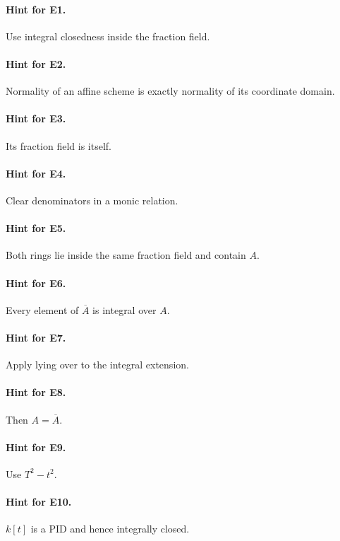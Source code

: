 \paragraph{Hint for E1.} Use integral closedness inside the fraction field.

\paragraph{Hint for E2.} Normality of an affine scheme is exactly normality of its coordinate domain.

\paragraph{Hint for E3.} Its fraction field is itself.

\paragraph{Hint for E4.} Clear denominators in a monic relation.

\paragraph{Hint for E5.} Both rings lie inside the same fraction field and contain $A$.

\paragraph{Hint for E6.} Every element of $\overline A$ is integral over $A$.

\paragraph{Hint for E7.} Apply lying over to the integral extension.

\paragraph{Hint for E8.} Then $A=\overline A$.

\paragraph{Hint for E9.} Use $T^2-t^2$.

\paragraph{Hint for E10.} $k[t]$ is a PID and hence integrally closed.

